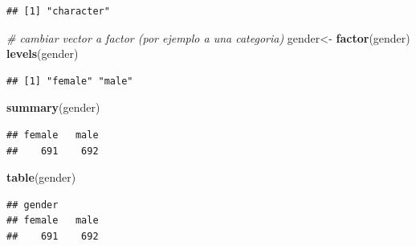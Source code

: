 \documentclass[]{book}
\newenvironment{Shaded}{\begin{snugshade}}{\end{snugshade}}
\newcommand{\KeywordTok}[1]{\textcolor[rgb]{0.13,0.29,0.53}{\textbf{#1}}}
\newcommand{\DataTypeTok}[1]{\textcolor[rgb]{0.13,0.29,0.53}{#1}}
\newcommand{\DecValTok}[1]{\textcolor[rgb]{0.00,0.00,0.81}{#1}}
\newcommand{\StringTok}[1]{\textcolor[rgb]{0.31,0.60,0.02}{#1}}
\newcommand{\CommentTok}[1]{\textcolor[rgb]{0.56,0.35,0.01}{\textit{#1}}}
\newcommand{\OperatorTok}[1]{\textcolor[rgb]{0.81,0.36,0.00}{\textbf{#1}}}
\newcommand{\NormalTok}[1]{#1}
\begin{document}
\begin{verbatim}
## [1] "character"
\end{verbatim}

\begin{Shaded}
\begin{Highlighting}[]
\CommentTok{# cambiar vector a factor (por ejemplo a una categoria)}
\NormalTok{gender<-}\StringTok{ }\KeywordTok{factor}\NormalTok{(gender)}
\KeywordTok{levels}\NormalTok{(gender)}
\end{Highlighting}
\end{Shaded}

\begin{verbatim}
## [1] "female" "male"
\end{verbatim}

\begin{Shaded}
\begin{Highlighting}[]
\KeywordTok{summary}\NormalTok{(gender)}
\end{Highlighting}
\end{Shaded}

\begin{verbatim}
## female   male 
##    691    692
\end{verbatim}

\begin{Shaded}
\begin{Highlighting}[]
\KeywordTok{table}\NormalTok{(gender)}
\end{Highlighting}
\end{Shaded}

\begin{verbatim}
## gender
## female   male 
##    691    692
\end{verbatim}

\begin{Shaded}
\end{Shaded}
\end{document}
